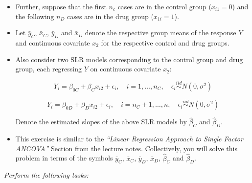 \documentclass[letterpaper]{article}
\begin{document}
	\begin{itemize}
		\item Further, suppose that the first $n_c$ cases are in the control group ($x_{i1} = 0$) and the following $n_D$ cases are in the drug group ($x_{1i} = 1$).
		
		\item Let $\bar{y}_C$, $\bar{x}_C$, $\bar{y}_D$ and $\bar{x}_D$ denote the respective group means of the response $Y$ and continuous covariate $x_2$ for the respective control and drug groups.
		
		\item Also consider two SLR models corresponding to the control group and drug group, each regressing $Y$ on continuous covariate $x_2$:
		
		\[
		Y_i = \beta_{0C} + \beta_C x_{i2} + \epsilon_i, \quad i = 1, \ldots, n_C, \quad \epsilon_i \overset{iid}{\sim} N(0, \sigma^2)
		\]
		
		\[
		Y_i = \beta_{0D} + \beta_D x_{i2} + \epsilon_i, \quad i = n_C + 1, \ldots, n, \quad \epsilon_i \overset{iid}{\sim} N(0, \sigma^2)
		\]
		
		Denote the estimated slopes of the above SLR models by $\hat{\beta}_C$ and $\hat{\beta}_D$.
		
		\item This exercise is similar to the \textit{``Linear Regression Approach to Single Factor ANCOVA''} Section from the lecture notes. Collectively, you will solve this problem in terms of the symbols $\bar{y}_C$, $\bar{x}_C$, $\bar{y}_D$, $\bar{x}_D$, $\hat{\beta}_C$ and $\hat{\beta}_D$.
	\end{itemize}

	\textit{Perform the following tasks:}
\end{document}
